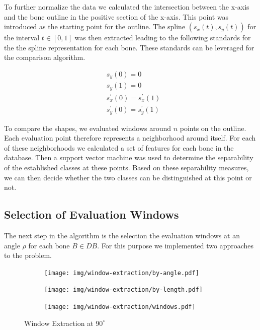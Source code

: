 \documentclass[pdftex,12pt,a4paper]{report}
\begin{document}
To further normalize the data we calculated the intersection between the x-axis and the bone outline
in the positive section of the x-axis. This point was introduced as the starting point for the outline.
The spline $(s_x(t), s_y(t))$ for the interval $t \in [0, 1]$ was then extracted leading to the
following standards for the the spline representation for each bone. These standards can be leveraged for the comparison algorithm.

\begin{equation}
\begin{split}
& s_y(0) = 0 \\
& s_y(1) = 0 \\
& s_x^\prime(0) = s_x^\prime(1) \\
& s_y^\prime(0) = s_y^\prime(1)
\end{split}
\end{equation}

To compare the shapes, we evaluated windows around $n$ points on the outline. Each evaluation
point therefore represents a neighborhood around itself. For each of these neighborhoods
we calculated a set of features for each bone in the database. Then a support vector machine
was used to determine the separability of the established classes at these points. Based on 
these separability measures, we can then decide whether the two classes can be distinguished
at this point or not. 

\subsection{Selection of Evaluation Windows}

The next step in the algorithm is the selection the evaluation windows at an angle $\rho$ for
each bone $B \in DB$. For this purpose we implemented two approaches to the problem.

\begin{figure}[h]
	\centering
	\begin{subfigure}[b]{0.32\textwidth}
		\centering
		\texttt{[image: img/window-extraction/by-angle.pdf]}
		\label{fig:window-extraction-angle}
	\end{subfigure}
	\begin{subfigure}[b]{0.32\textwidth}
		\centering
		\texttt{[image: img/window-extraction/by-length.pdf]}
		\label{fig:window-extraction-length}
	\end{subfigure}
	\begin{subfigure}[b]{0.32\textwidth}
		\centering
		\texttt{[image: img/window-extraction/windows.pdf]}
		\vfill
		\label{fig:window-extraction-all}
	\end{subfigure}
	\caption{Window Extraction at $90^\circ$}
	\label{fig:window-extraction}
\end{figure}
\end{document}
